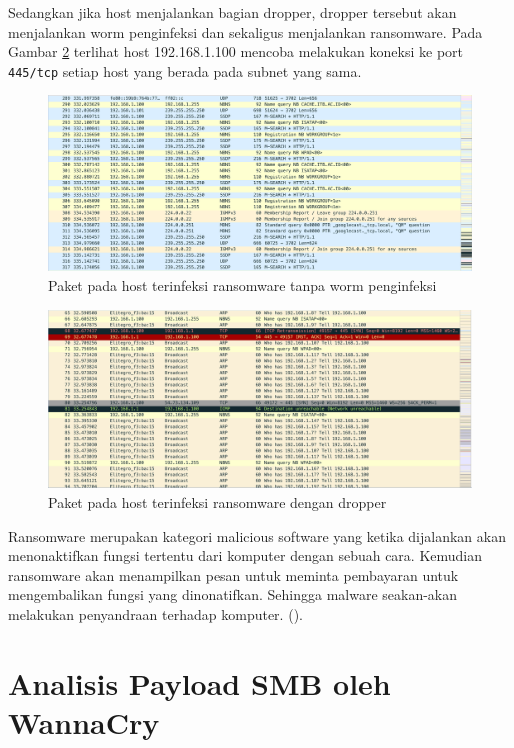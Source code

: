 Sedangkan jika host menjalankan bagian dropper, dropper tersebut akan menjalankan worm penginfeksi dan sekaligus menjalankan ransomware. Pada Gambar \ref{fig:infect_action} terlihat host 192.168.1.100  mencoba melakukan koneksi ke port \verb|445/tcp| setiap host yang berada pada subnet yang sama.

\begin{figure}[H]
	\centering
	\includegraphics[width=\textwidth]{resources/no_infect_action.png}
	\caption{Paket pada host terinfeksi ransomware tanpa worm penginfeksi}
	\label{fig:no_infect_action}
\end{figure}

\begin{figure}[H]
	\centering
	\includegraphics[width=\textwidth]{resources/infect_action.png}
	\caption{Paket pada host terinfeksi ransomware dengan dropper}
	\label{fig:infect_action}
\end{figure}

Ransomware merupakan kategori malicious software yang ketika dijalankan akan menonaktifkan fungsi tertentu dari komputer dengan sebuah cara. Kemudian ransomware akan menampilkan pesan untuk meminta pembayaran untuk mengembalikan fungsi yang dinonatifkan. Sehingga malware seakan-akan melakukan penyandraan terhadap komputer. (\cite{o2012ransomware}).

\section{Analisis Payload SMB oleh WannaCry}

